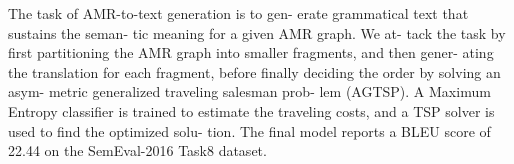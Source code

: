 The task of AMR-to-text generation is to gen- erate grammatical text that sustains the seman- tic meaning for a given AMR graph. We at- tack the task by first partitioning the AMR graph into smaller fragments, and then gener- ating the translation for each fragment, before finally deciding the order by solving an asym- metric generalized traveling salesman prob- lem (AGTSP). A Maximum Entropy classifier is trained to estimate the traveling costs, and a TSP solver is used to find the optimized solu- tion. The final model reports a BLEU score of 22.44 on the SemEval-2016 Task8 dataset.
